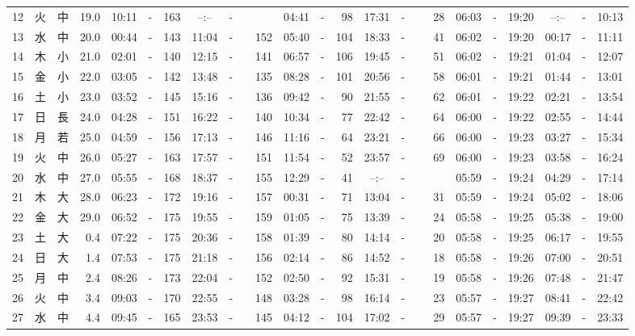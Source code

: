 \documentclass[12pt,a4j]{jsarticle}
\begin{document}
\begin{table}[htbp]
\begin{center}
{\begin{tabular}{|rc|cr|ccrccr|ccrccr|ccc|ccc|}
12 & 火 & 中 & 19.0 &  10:11 &-& 163 &  --:-- &-&~~~~~ &  04:41 &-&  98 &  17:31 &-&  28 & 06:03 & -& 19:20 & --:-- & -& 10:13 \\
13 & 水 & 中 & 20.0 &  00:44 &-& 143 &  11:04 &-& 152 &  05:40 &-& 104 &  18:33 &-&  41 & 06:02 & -& 19:20 & 00:17 & -& 11:11 \\
14 & 木 & 小 & 21.0 &  02:01 &-& 140 &  12:15 &-& 141 &  06:57 &-& 106 &  19:45 &-&  51 & 06:02 & -& 19:21 & 01:04 & -& 12:07 \\
15 & 金 & 小 & 22.0 &  03:05 &-& 142 &  13:48 &-& 135 &  08:28 &-& 101 &  20:56 &-&  58 & 06:01 & -& 19:21 & 01:44 & -& 13:01 \\
16 & 土 & 小 & 23.0 &  03:52 &-& 145 &  15:16 &-& 136 &  09:42 &-&  90 &  21:55 &-&  62 & 06:01 & -& 19:22 & 02:21 & -& 13:54 \\
17 & 日 & 長 & 24.0 &  04:28 &-& 151 &  16:22 &-& 140 &  10:34 &-&  77 &  22:42 &-&  64 & 06:00 & -& 19:22 & 02:55 & -& 14:44 \\
18 & 月 & 若 & 25.0 &  04:59 &-& 156 &  17:13 &-& 146 &  11:16 &-&  64 &  23:21 &-&  66 & 06:00 & -& 19:23 & 03:27 & -& 15:34 \\
19 & 火 & 中 & 26.0 &  05:27 &-& 163 &  17:57 &-& 151 &  11:54 &-&  52 &  23:57 &-&  69 & 06:00 & -& 19:23 & 03:58 & -& 16:24 \\
20 & 水 & 中 & 27.0 &  05:55 &-& 168 &  18:37 &-& 155 &  12:29 &-&  41 &  --:-- &-&~~~~~ & 05:59 & -& 19:24 & 04:29 & -& 17:14 \\
21 & 木 & 大 & 28.0 &  06:23 &-& 172 &  19:16 &-& 157 &  00:31 &-&  71 &  13:04 &-&  31 & 05:59 & -& 19:24 & 05:02 & -& 18:06 \\
22 & 金 & 大 & 29.0 &  06:52 &-& 175 &  19:55 &-& 159 &  01:05 &-&  75 &  13:39 &-&  24 & 05:58 & -& 19:25 & 05:38 & -& 19:00 \\
23 & 土 & 大 &  0.4 &  07:22 &-& 175 &  20:36 &-& 158 &  01:39 &-&  80 &  14:14 &-&  20 & 05:58 & -& 19:25 & 06:17 & -& 19:55 \\
24 & 日 & 大 &  1.4 &  07:53 &-& 175 &  21:18 &-& 156 &  02:14 &-&  86 &  14:52 &-&  18 & 05:58 & -& 19:26 & 07:00 & -& 20:51 \\
25 & 月 & 中 &  2.4 &  08:26 &-& 173 &  22:04 &-& 152 &  02:50 &-&  92 &  15:31 &-&  19 & 05:58 & -& 19:26 & 07:48 & -& 21:47 \\
26 & 火 & 中 &  3.4 &  09:03 &-& 170 &  22:55 &-& 148 &  03:28 &-&  98 &  16:14 &-&  23 & 05:57 & -& 19:27 & 08:41 & -& 22:42 \\
27 & 水 & 中 &  4.4 &  09:45 &-& 165 &  23:53 &-& 145 &  04:12 &-& 104 &  17:02 &-&  29 & 05:57 & -& 19:27 & 09:39 & -& 23:33 \\

\end{tabular}}
\end{center}
\end{table}
\end{document}
